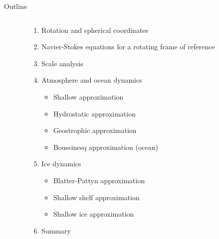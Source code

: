 \documentclass[aspectratio=169,xcolor=dvipsnames]{beamer}
\begin{document}
\begin{frame}{Outline}
    \begin{columns}
    \begin{column}{0.15\textwidth}
    \end{column}
    \begin{column}{0.8\textwidth}
    \begin{enumerate}
        \item Rotation and spherical coordinates
        \item Navier-Stokes equations for a rotating frame of reference
        \item Scale analysis
        \item Atmosphere and ocean dynamics
        \begin{itemize}
            \item Shallow approximation
            \item Hydrostatic approximation
            \item Geostrophic approximation
            \item Boussinesq approximation (ocean)
        \end{itemize}
        \item Ice dynamics
        \begin{itemize}
            \item Blatter-Pattyn approximation
            \item Shallow shelf approximation
            \item Shallow ice approximation
        \end{itemize}
        \item Summary
    \end{enumerate}
    \end{column}
    \begin{column}{0.1\textwidth}
    \end{column}
    \end{columns}
\end{frame}
\end{document}
